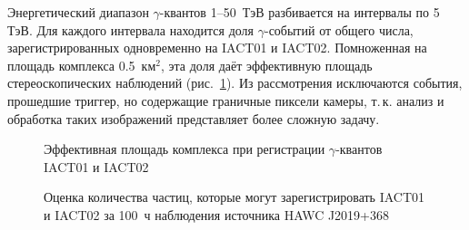 \documentclass[magd,floatypics,numeref]{msudipl} %
\begin{document}
Энергетический диапазон $\gamma$-квантов 1--50~ТэВ разбивается на интервалы по 5 ТэВ. Для каждого интервала находится доля $\gamma$-событий от общего числа, зарегистрированных одновременно на IACT01 и IACT02. Помноженная на площадь комплекса 0.5~км$^2$, эта доля даёт эффективную площадь стереоскопических наблюдений (рис.~\ref{pic:EffectiveArea}\afterpage{\clearpage}). Из рассмотрения исключаются события, прошедшие триггер, но содержащие граничные пиксели камеры, т.\,к. анализ и обработка таких изображений представляет более сложную задачу.

\begin{figure}[b]
	\noindent{}
	\caption{Эффективная площадь комплекса при регистрации $\gamma$-квантов IACT01 и IACT02}
	\label{pic:EffectiveArea}
\end{figure}

\begin{figure}[b]
	\noindent{}
	\caption{Оценка количества частиц, которые могут зарегистрировать IACT01 и IACT02 за 100~ч наблюдения источника HAWC J2019+368}
	\label{pic:EffectiveSpectra}
\end{figure}
\end{document}
